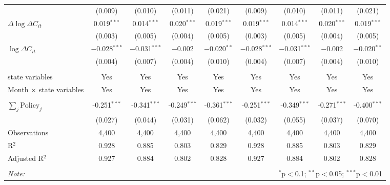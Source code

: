 \begin{tabular}{@{\extracolsep{1pt}}lcccccccc}
  & (0.009) & (0.010) & (0.011) & (0.021) & (0.009) & (0.010) & (0.011) & (0.021) \\ 
  $\Delta \log \Delta C_{it}$ & 0.019$^{***}$ & 0.014$^{***}$ & 0.020$^{***}$ & 0.019$^{***}$ & 0.019$^{***}$ & 0.014$^{***}$ & 0.020$^{***}$ & 0.019$^{***}$ \\ 
  & (0.003) & (0.005) & (0.004) & (0.005) & (0.003) & (0.005) & (0.004) & (0.005) \\ 
  $\log \Delta C_{it}$ & $-$0.028$^{***}$ & $-$0.031$^{***}$ & $-$0.002 & $-$0.020$^{**}$ & $-$0.028$^{***}$ & $-$0.031$^{***}$ & $-$0.002 & $-$0.020$^{**}$ \\ 
  & (0.004) & (0.007) & (0.004) & (0.010) & (0.004) & (0.007) & (0.004) & (0.010) \\ 
 \hline \\[-1.8ex] 
state variables & Yes & Yes & Yes & Yes & Yes & Yes & Yes & Yes \\ 
Month $\times$ state variables & Yes & Yes & Yes & Yes & Yes & Yes & Yes & Yes \\ 
\hline \\[-1.8ex] 
$\sum_j \mathrm{Policy}_j$ & -0.251$^{***}$ & -0.341$^{***}$ & -0.249$^{***}$ & -0.361$^{***}$ & -0.251$^{***}$ & -0.349$^{***}$ & -0.271$^{***}$ & -0.400$^{***}$ \\ 
 & (0.027) & (0.044) & (0.031) & (0.062) & (0.032) & (0.055) & (0.037) & (0.070) \\ 
Observations & 4,400 & 4,400 & 4,400 & 4,400 & 4,400 & 4,400 & 4,400 & 4,400 \\ 
R$^{2}$ & 0.928 & 0.885 & 0.803 & 0.829 & 0.928 & 0.885 & 0.803 & 0.829 \\ 
Adjusted R$^{2}$ & 0.927 & 0.884 & 0.802 & 0.828 & 0.927 & 0.884 & 0.802 & 0.828 \\ 
\hline 
\hline \\[-1.8ex] 
\textit{Note:}  & \multicolumn{8}{r}{$^{*}$p$<$0.1; $^{**}$p$<$0.05; $^{***}$p$<$0.01} \\ 
\end{tabular} 